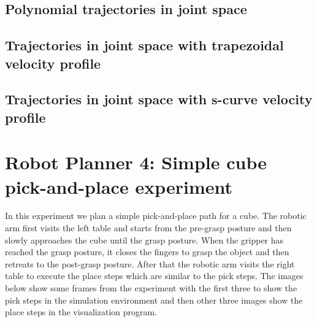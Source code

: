 \subsection{Polynomial trajectories in joint space}

\subsection{Trajectories in joint space with trapezoidal velocity profile}

\subsection{Trajectories in joint space with s-curve velocity profile}

\section{Robot Planner 4: Simple cube pick-and-place experiment}

In this experiment we plan a simple pick-and-place path for a cube. The robotic arm first visits the left table and starts from the pre-grasp posture and then 
slowly approaches the cube until the grasp posture. When the gripper has reached the grasp posture, it closes the fingers to grasp the object and then retreats 
to the post-grasp posture. After that the robotic arm visits the right table to execute the place steps which are similar to the pick steps. The images below 
show some frames from the experiment with the first three to show the pick steps in the simulation environment and then other three images show the place steps 
in the visualization program.

